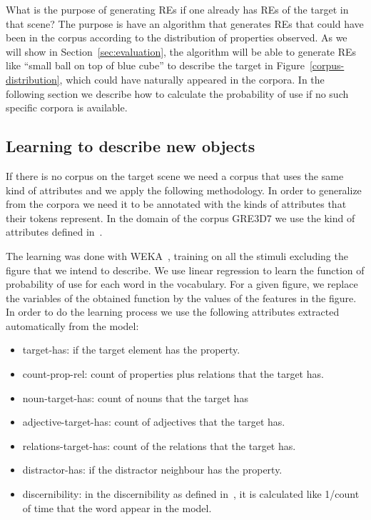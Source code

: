 What is the purpose of generating REs if one already has REs of the target in that scene? The purpose is have an algorithm that generates REs that could have been in the corpus according to the distribution of properties observed. As we will show in Section~\ref{sec:evaluation}, the algorithm will be able to generate REs like ``small ball on top of blue cube'' to describe the target in Figure~\ref{corpus-distribution}, which could have naturally appeared in the corpora. In the following section we describe how to calculate the probability of use if no such specific corpora is available. 

\subsection{Learning to describe new objects}

If there is no corpus on the target scene we need a corpus that uses the same kind of attributes and we apply the following methodology. In order to generalize from the corpora we need it to be annotated with the kinds of attributes that their tokens represent. In the domain of the corpus GRE3D7 we use the kind of attributes defined in~\cite{viet:gene11}. 

The learning was done with WEKA~\cite{Hall:WEK09}, training on all the stimuli excluding the figure that we intend to describe. We use linear regression to learn the function of probability of use for each word in the vocabulary. For a given figure, we replace the variables of the obtained function by the values of the features in the figure. In order to do the learning process we use the following attributes extracted automatically from the model:  

\begin{itemize}
\item target-has: if the target element has the property.
\item count-prop-rel: count of properties plus relations that the target has.
\item noun-target-has: count of nouns that the target has
\item adjective-target-has: count of adjectives that the target has.
\item relations-target-has: count of the relations that the target has.
\item distractor-has: if the distractor neighbour has the property.
\item discernibility: in the discernibility as defined in~\cite{gatt:nond11}, it is calculated like 1/count of time that the word appear in the model.
\end{itemize}

